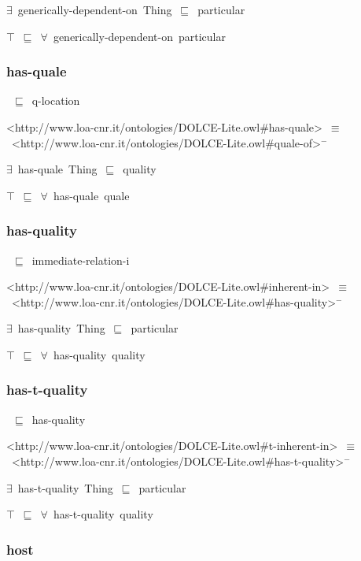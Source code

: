 \documentclass{article}
\begin{document}
\ensuremath{\exists}~generically-dependent-on~Thing~\ensuremath{\sqsubseteq}~particular

\ensuremath{\top}~\ensuremath{\sqsubseteq}~\ensuremath{\forall}~generically-dependent-on~particular

\subsubsection*{has-quale}

~\ensuremath{\sqsubseteq}~q-location

<http://www.loa-cnr.it/ontologies/DOLCE-Lite.owl#has-quale>~\ensuremath{\equiv}~<http://www.loa-cnr.it/ontologies/DOLCE-Lite.owl#quale-of>\ensuremath{^-}

\ensuremath{\exists}~has-quale~Thing~\ensuremath{\sqsubseteq}~quality

\ensuremath{\top}~\ensuremath{\sqsubseteq}~\ensuremath{\forall}~has-quale~quale

\subsubsection*{has-quality}

~\ensuremath{\sqsubseteq}~immediate-relation-i

<http://www.loa-cnr.it/ontologies/DOLCE-Lite.owl#inherent-in>~\ensuremath{\equiv}~<http://www.loa-cnr.it/ontologies/DOLCE-Lite.owl#has-quality>\ensuremath{^-}

\ensuremath{\exists}~has-quality~Thing~\ensuremath{\sqsubseteq}~particular

\ensuremath{\top}~\ensuremath{\sqsubseteq}~\ensuremath{\forall}~has-quality~quality

\subsubsection*{has-t-quality}

~\ensuremath{\sqsubseteq}~has-quality

<http://www.loa-cnr.it/ontologies/DOLCE-Lite.owl#t-inherent-in>~\ensuremath{\equiv}~<http://www.loa-cnr.it/ontologies/DOLCE-Lite.owl#has-t-quality>\ensuremath{^-}

\ensuremath{\exists}~has-t-quality~Thing~\ensuremath{\sqsubseteq}~particular

\ensuremath{\top}~\ensuremath{\sqsubseteq}~\ensuremath{\forall}~has-t-quality~quality

\subsubsection*{host}
\end{document}
